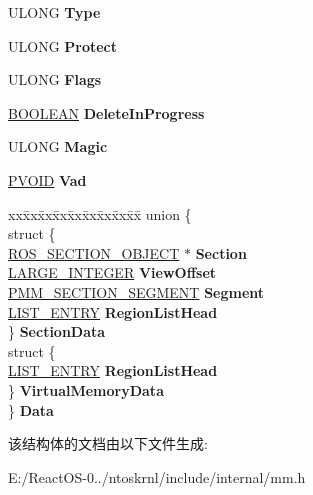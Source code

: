 \begin{DoxyCompactItemize}
U\+L\+O\+NG {\bfseries Type}
\item 
\mbox{\label{struct___m_e_m_o_r_y___a_r_e_a_a66c6096fc79c9637469284d986bbb56b}} 
U\+L\+O\+NG {\bfseries Protect}
\item 
\mbox{\label{struct___m_e_m_o_r_y___a_r_e_a_ab8fa2d3d139b5cadfeb3575d07181712}} 
U\+L\+O\+NG {\bfseries Flags}
\item 
\mbox{\label{struct___m_e_m_o_r_y___a_r_e_a_aca28b50e80e3732419c2cbc7411efc55}} 
\hyperlink{_processor_bind_8h_a112e3146cb38b6ee95e64d85842e380a}{B\+O\+O\+L\+E\+AN} {\bfseries Delete\+In\+Progress}
\item 
\mbox{\label{struct___m_e_m_o_r_y___a_r_e_a_ac7b61e59163cab9608794c57e07e1b3e}} 
U\+L\+O\+NG {\bfseries Magic}
\item 
\mbox{\label{struct___m_e_m_o_r_y___a_r_e_a_a1596b25f7dac8fccd180c6b303a86769}} 
\hyperlink{interfacevoid}{P\+V\+O\+ID} {\bfseries Vad}
\item 
\mbox{\label{struct___m_e_m_o_r_y___a_r_e_a_abbb5be61bf2cffc1f386958b94702b84}} 
\begin{tabbing}
xx\=xx\=xx\=xx\=xx\=xx\=xx\=xx\=xx\=\kill
union \{\\
\>struct \{\\
\>\>\hyperlink{struct___r_o_s___s_e_c_t_i_o_n___o_b_j_e_c_t}{ROS\_SECTION\_OBJECT} $\ast$ {\bfseries Section}\\
\>\>\hyperlink{union___l_a_r_g_e___i_n_t_e_g_e_r}{LARGE\_INTEGER} {\bfseries ViewOffset}\\
\>\>\hyperlink{struct___m_m___s_e_c_t_i_o_n___s_e_g_m_e_n_t}{PMM\_SECTION\_SEGMENT} {\bfseries Segment}\\
\>\>\hyperlink{struct___l_i_s_t___e_n_t_r_y}{LIST\_ENTRY} {\bfseries RegionListHead}\\
\>\} {\bfseries SectionData}\\
\>struct \{\\
\>\>\hyperlink{struct___l_i_s_t___e_n_t_r_y}{LIST\_ENTRY} {\bfseries RegionListHead}\\
\>\} {\bfseries VirtualMemoryData}\\
\} {\bfseries Data}\\

\end{tabbing}\end{DoxyCompactItemize}


该结构体的文档由以下文件生成\+:\begin{DoxyCompactItemize}
\item 
E\+:/\+React\+O\+S-\/0../ntoskrnl/include/internal/mm.\+h\end{DoxyCompactItemize}
